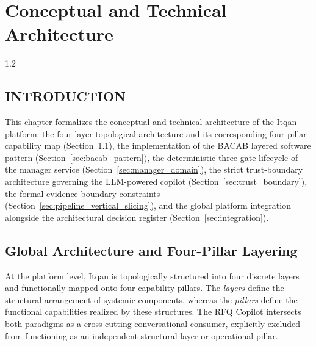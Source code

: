 \chapter{Conceptual and Technical Architecture}\label{chap:architecture}
\begin{spacing}{1.2}
\minitoc
\thispagestyle{MyStyle}
\end{spacing}
\newpage

\section*{INTRODUCTION}
This chapter formalizes the conceptual and technical architecture of the Itqan platform: the four-layer topological architecture and its corresponding four-pillar capability map (Section~\ref{sec:global_architecture}), the implementation of the BACAB layered software pattern (Section~\ref{sec:bacab_pattern}), the deterministic three-gate lifecycle of the manager service (Section~\ref{sec:manager_domain}), the strict trust-boundary architecture governing the LLM-powered copilot (Section~\ref{sec:trust_boundary}), the formal evidence boundary constraints (Section~\ref{sec:pipeline_vertical_slicing}), and the global platform integration alongside the architectural decision register (Section~\ref{sec:integration}).

\section{Global Architecture and Four-Pillar Layering}\label{sec:global_architecture}
At the platform level, Itqan is topologically structured into four discrete layers and functionally mapped onto four capability pillars. The \textit{layers} define the structural arrangement of systemic components, whereas the \textit{pillars} define the functional capabilities realized by these structures. The RFQ Copilot intersects both paradigms as a cross-cutting conversational consumer, explicitly excluded from functioning as an independent structural layer or operational pillar.

